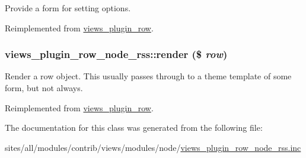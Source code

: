 Provide a form for setting options. 

Reimplemented from \hyperlink{classviews__plugin__row_6914c39d64977a0aa71da39cc1af004e}{views\_\-plugin\_\-row}.\hypertarget{classviews__plugin__row__node__rss_94b9baa2d0a6e196f3da863cf1784343}{
\subsubsection[{render}]{\setlength{\rightskip}{0pt plus 5cm}views\_\-plugin\_\-row\_\-node\_\-rss::render (\$ {\em row})}}
\label{classviews__plugin__row__node__rss_94b9baa2d0a6e196f3da863cf1784343}


Render a row object. This usually passes through to a theme template of some form, but not always. 

Reimplemented from \hyperlink{classviews__plugin__row_8243842e087dd28664b32cef0309f2a6}{views\_\-plugin\_\-row}.

The documentation for this class was generated from the following file:\begin{CompactItemize}
\item 
sites/all/modules/contrib/views/modules/node/\hyperlink{views__plugin__row__node__rss_8inc}{views\_\-plugin\_\-row\_\-node\_\-rss.inc}\end{CompactItemize}
